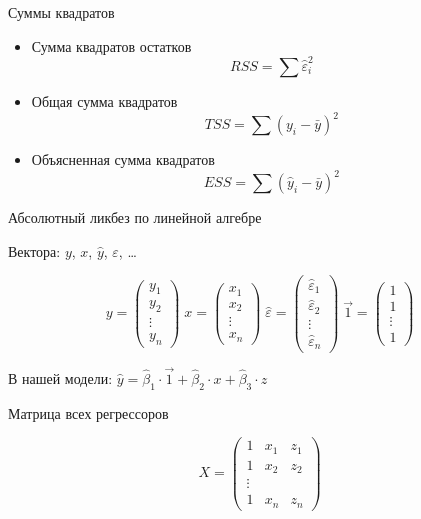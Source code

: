\begin{frame}{Суммы квадратов}

\begin{itemize}
\item
  Сумма квадратов остатков \[
  RSS=\sum \hat{\varepsilon}_i^2
  \]
\item
  Общая сумма квадратов \[
  TSS=\sum (y_i-\bar{y})^2
  \]
\item
  Объясненная сумма квадратов \[
  ESS=\sum (\hat{y}_i-\bar{y})^2
  \]
\end{itemize}

\end{frame}

\begin{frame}{Абсолютный ликбез по линейной алгебре}

Вектора: \(y\), \(x\), \(\hat{y}\), \(\varepsilon\), \ldots

\[
y=\begin{pmatrix}
y_1 \\
y_2 \\
\vdots \\
y_n
\end{pmatrix}\;
x=\begin{pmatrix}
x_1 \\
x_2 \\
\vdots \\
x_n
\end{pmatrix}\;
\hat{\varepsilon}=\begin{pmatrix}
\hat{\varepsilon}_1 \\
\hat{\varepsilon}_2 \\
\vdots \\
\hat{\varepsilon}_n
\end{pmatrix}\;
\vec{1}=\begin{pmatrix}
1 \\
1 \\
\vdots \\
1
\end{pmatrix}
\]

В нашей модели:
\(\hat{y}=\hat{\beta}_1 \cdot \vec{1}+\hat{\beta}_2 \cdot x +\hat{\beta}_3 \cdot z\)

\end{frame}

\begin{frame}{Матрица всех регрессоров}

\[
X=\begin{pmatrix}
1 & x_1 & z_1 \\
1 & x_2 & z_2 \\
\vdots \\
1 & x_n & z_n 
\end{pmatrix}
\]

\end{frame}

